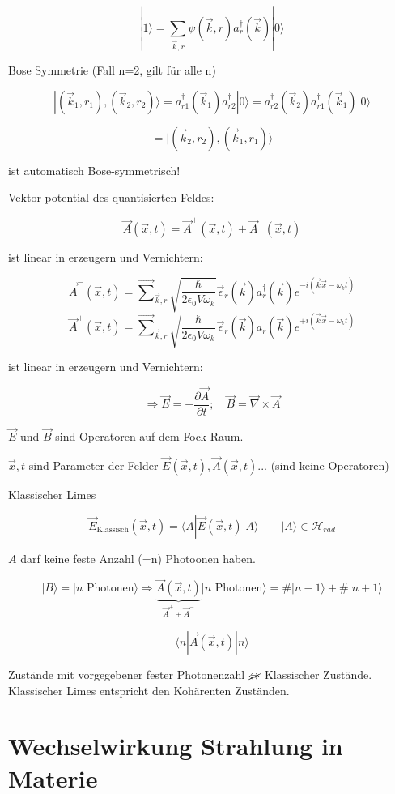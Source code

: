 \[|1\rangle  = \sum_{\vec k,r}\psi(\vec k,r)a^\dagger_r(\vec k)|0\rangle \]

Bose Symmetrie (Fall n=2, gilt für alle n)


\[|(\vec k_1,r_1),(\vec k_2,r_2)\rangle = a^\dagger_{r1}(\vec k_1) a^\dagger_{r2} |0\rangle =  a^\dagger_{r2}(\vec k_2) a^\dagger_{r1}(\vec k_1) |0\rangle   \]

\[= |(\vec k_2,r_2),(\vec k_1,r_1)\rangle    \]

ist automatisch Bose-symmetrisch!


Vektor potential des quantisierten Feldes:

\[\vec A(\vec x,t) = \vec A^+(\vec x,t) +\vec A^-(\vec x,t)  \]


ist linear in erzeugern und Vernichtern:

\[\vec A^-(\vec x,t) =\vec \sum_{\vec k,r} \sqrt{\frac{\hbar}{2\epsilon_0 V\omega_k}}\vec \epsilon_r(\vec k)a^\dagger_r(\vec k)e^{-i(\vec k\vec x-\omega_k t)}\]
\[\vec A^+(\vec x,t) =\vec \sum_{\vec k,r} \sqrt{\frac{\hbar}{2\epsilon_0 V\omega_k}}\vec \epsilon_r(\vec k)a_r(\vec k)e^{+i(\vec k\vec x-\omega_k t)}\]

ist linear in erzeugern und Vernichtern:

\[\Rightarrow \vec E = -\frac{\partial \vec A}{\partial t};\quad \vec B = \vec\nabla\times\vec A\]

\(\vec E\) und \(\vec B\) sind Operatoren auf dem Fock Raum.

\(\vec x,t\) sind Parameter der Felder \(\vec E(\vec x,t),\vec A(\vec x,t)...\) (sind keine Operatoren)


Klassischer Limes

\[\vec E_{\text{Klassisch}}(\vec x,t) = \langle A|\vec E(\vec x,t)|A\rangle \qquad |A\rangle \in \mathcal H_{rad}\]

\(A\) darf keine feste Anzahl (=n) Photoonen haben. 

\[|B\rangle  = |n \text{ Photonen}\rangle  \Rightarrow \underbrace{\vec A(\vec x,t)}_{\vec A^++\vec A^-}|n \text{ Photonen}\rangle = \#|n-1\rangle +  \#|n+1\rangle  \]


\[\langle n| \vec A(\vec x,t)|n\rangle \]


Zustände mit vorgegebener fester Photonenzahl \(\cancel \Leftrightarrow \) Klassischer Zustände. Klassischer Limes entspricht den Kohärenten Zuständen. 


\section{Wechselwirkung Strahlung in Materie}


